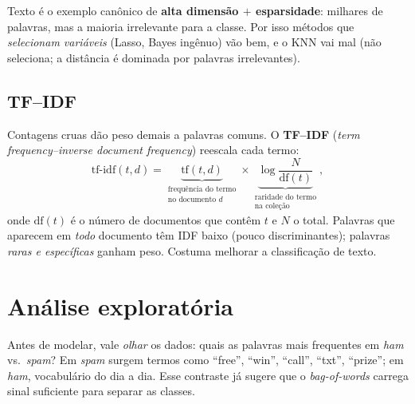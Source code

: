 \documentclass[11pt,a4paper]{article}
\begin{document}
\begin{atencao}
Texto é o exemplo canônico de \textbf{alta dimensão $+$ esparsidade}: milhares de
palavras, mas a maioria irrelevante para a classe. Por isso métodos que
\emph{selecionam variáveis} (Lasso, Bayes ingênuo) vão bem, e o KNN vai mal (não
seleciona; a distância é dominada por palavras irrelevantes).
\end{atencao}

\subsection{TF--IDF}
Contagens cruas dão peso demais a palavras comuns. O \textbf{TF--IDF}
(\emph{term frequency--inverse document frequency}) reescala cada termo:
\[
  \text{tf-idf}(t,d) = \underbrace{\text{tf}(t,d)}_{\substack{\text{frequência do termo}\\\text{no documento }d}}
  \times
  \underbrace{\log\frac{N}{\text{df}(t)}}_{\substack{\text{raridade do termo}\\\text{na coleção}}},
\]
onde $\text{df}(t)$ é o número de documentos que contêm $t$ e $N$ o total. Palavras
que aparecem em \emph{todo} documento têm IDF baixo (pouco discriminantes); palavras
\emph{raras e específicas} ganham peso. Costuma melhorar a classificação de texto.

\section{Análise exploratória}
Antes de modelar, vale \emph{olhar} os dados: quais as palavras mais frequentes em
\emph{ham} vs.\ \emph{spam}? Em \emph{spam} surgem termos como ``free'', ``win'',
``call'', ``txt'', ``prize''; em \emph{ham}, vocabulário do dia a dia. Esse contraste
já sugere que o \emph{bag-of-words} carrega sinal suficiente para separar as classes.

\end{document}
